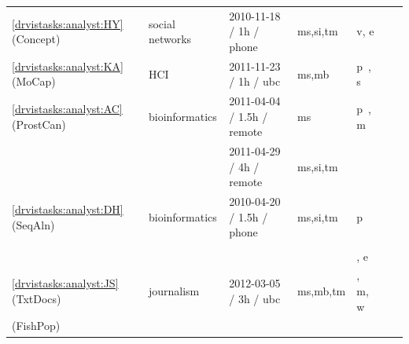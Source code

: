 \begin{table}
\begin{center}
\begin{tabular}{ | l | l | l | l | l | l | l |}
        \rowcolor{gray!15}
        
        \ref{drvistasks:analyst:HY} ({\sc Concept}) & social networks\index{social networks} & 2010-11-18 / 1h / phone & {\sc ms,si,tm} & v, e 
        
        \\
        
        \ref{drvistasks:analyst:KA} ({\sc MoCap}) & \ac{HCI}\index{human-computer interaction (HCI)} & 2011-11-23 / 1h / {\sc ubc} & {\sc ms,mb} & p~\cite{Altun2010,Tuncel2009}, s
        
        \\
        
        \rowcolor{gray!15}
        
        \ref{drvistasks:analyst:AC} ({\sc ProstCan}) & bioinformatics\index{bioinformatics} & 2011-04-04 / 1.5h / remote &{\sc ms} & p~\cite{Saeys2007}, m
        
        \\
        
        \rowcolor{gray!15}
        
        &  & 2011-04-29 / 4h / remote & {\sc ms,si,tm} & 
        
        \\
        
        \ref{drvistasks:analyst:DH} ({\sc SeqAln}) & bioinformatics\index{bioinformatics} & 2010-04-20 / 1.5h / phone & {\sc ms,si,tm} & p~\cite{Blackshields2010,Culhane2003,Culhane2005} 
        
        \\
        
        & & & & \cite{Higgins1992,Fagan2007,Madden2010}
        
        \\
        
        & & & & \cite{Wallace2007a,Shi2010}, e 
        
        \\
        
        \rowcolor{gray!15}
        
        \ref{drvistasks:analyst:JS} ({\sc TxtDocs}) & journalism\index{journalism} & 2012-03-05 / 3h / {\sc ubc} & {\sc ms,mb,tm} & \cite{Brehmer2014}, m, w
        
        \\
        
        \hline
        
        {rownumber} 
		\therownumber\label{drvistasks:analyst:CH} ({\sc FishPop}) %
		

\end{tabular}
\end{center}
\end{table}
